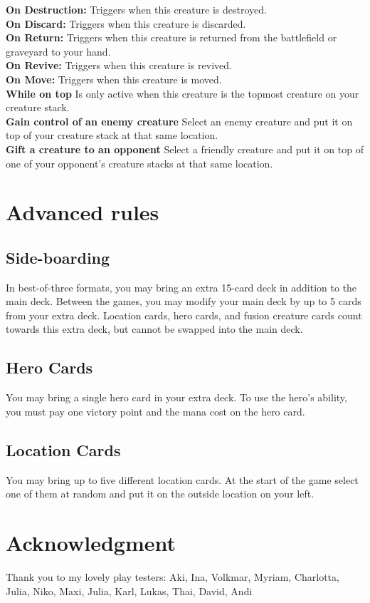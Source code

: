 \documentclass[conference]{IEEEtran}
\begin{document}
\textbf{On Destruction:} Triggers when this creature is destroyed.\\
\textbf{On Discard:} Triggers when this creature is discarded.\\
\textbf{On Return:} Triggers when this creature is returned from the battlefield or graveyard to your hand.\\
\textbf{On Revive:} Triggers when this creature is revived.\\
\textbf{On Move:} Triggers when this creature is moved.\\
\textbf{While on top} Is only active when this creature is the topmost creature on your creature stack.\\
\textbf{Gain control of an enemy creature} Select an enemy creature and put it on top of your creature stack at that same location.\\
\textbf{Gift a creature to an opponent} Select a friendly creature and put it on top of one of your opponent's creature stacks at that same location.\\

\section{Advanced rules}
\subsection{Side-boarding}
\label{subsec:sideboard}
In best-of-three formats, you may bring an extra 15-card deck in addition to the main deck.
Between the games, you may modify your main deck by up to 5 cards from your extra deck.
Location cards, hero cards, and fusion creature cards count towards this extra deck, but cannot be swapped into the main deck.

\subsection{Hero Cards}
\label{subsec:hero}
You may bring a single hero card in your extra deck.
To use the hero's ability, you must pay one victory point and the mana cost on the hero card.

\subsection{Location Cards}
\label{subsec:location}
You may bring up to five different location cards. 
At the start of the game select one of them at random and put it on the outside location on your left.

\section*{Acknowledgment}

Thank you to my lovely play testers: 
Aki, Ina, Volkmar, Myriam, Charlotta, Julia, Niko, Maxi, Julia, Karl, Lukas, Thai, David, Andi
\vspace{12pt}
\end{document}
